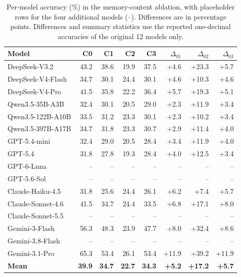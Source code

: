 \documentclass[11pt]{article}
\begin{document}
\begin{table}[t]
\centering
\caption{Per-model accuracy (\%) in the memory-content ablation, with placeholder rows for the four additional models (--). Differences are in percentage points. Differences and summary statistics use the reported one-decimal accuracies of the original 12 models only.}
\label{tab:memory_ablation_full}
\setlength{\tabcolsep}{3.5pt}
\scriptsize
\begin{tabular}{lrrrrrrr}
\toprule
\textbf{Model} & \textbf{C0} & \textbf{C1} & \textbf{C2} & \textbf{C3} & \textbf{$\Delta_{01}$} & \textbf{$\Delta_{02}$} & \textbf{$\Delta_{03}$} \\
\midrule
DeepSeek-V3.2        & 43.2 & 38.6 & 19.9 & 37.5 & +4.6 & +23.3 & +5.7 \\
DeepSeek-V4-Flash    & 34.7 & 30.1 & 24.4 & 30.1 & +4.6 & +10.3 & +4.6 \\
DeepSeek-V4-Pro      & 41.5 & 35.8 & 22.2 & 36.4 & +5.7 & +19.3 & +5.1 \\
Qwen3.5-35B-A3B      & 32.4 & 30.1 & 20.5 & 29.0 & +2.3 & +11.9 & +3.4 \\
Qwen3.5-122B-A10B    & 33.5 & 31.2 & 23.3 & 30.1 & +2.3 & +10.2 & +3.4 \\
Qwen3.5-397B-A17B    & 34.7 & 31.8 & 23.3 & 30.7 & +2.9 & +11.4 & +4.0 \\
GPT-5.4-mini         & 32.4 & 29.0 & 20.5 & 28.4 & +3.4 & +11.9 & +4.0 \\
GPT-5.4              & 31.8 & 27.8 & 19.3 & 28.4 & +4.0 & +12.5 & +3.4 \\
GPT-6-Luna              & -- & -- & -- & -- & -- & -- & -- \\
GPT-5.6-Sol             & -- & -- & -- & -- & -- & -- & -- \\
Claude-Haiku-4.5     & 31.8 & 25.6 & 24.4 & 26.1 & +6.2 & +7.4 & +5.7 \\
Claude-Sonnet-4.6    & 41.5 & 34.7 & 24.4 & 33.5 & +6.8 & +17.1 & +8.0 \\
Claude-Sonnet-5.5       & -- & -- & -- & -- & -- & -- & -- \\
Gemini-3-Flash       & 56.3 & 48.3 & 23.9 & 47.7 & +8.0 & +32.4 & +8.6 \\
Gemini-3.8-Flash        & -- & -- & -- & -- & -- & -- & -- \\
Gemini-3.1-Pro       & 65.3 & 53.4 & 26.1 & 53.4 & +11.9 & +39.2 & +11.9 \\
\midrule
\textbf{Mean}       & \textbf{39.9} & \textbf{34.7} & \textbf{22.7} & \textbf{34.3} & \textbf{+5.2} & \textbf{+17.2} & \textbf{+5.7} \\
\bottomrule
\end{tabular}
\end{table}
\end{document}
